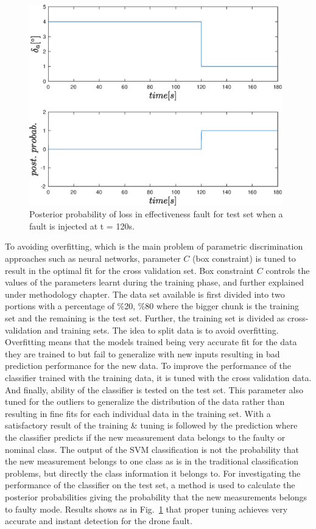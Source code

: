 \begin{figure}
\begin{center}
\includegraphics[width=11cm]{figures/post_prob}    %
\caption{Posterior probability of loss in effectiveness fault for test set when a fault is injected at t = 120s.} 
\label{fig:post_prob}
\end{center}
\end{figure}

To avoiding overfitting, which is the main problem of parametric discrimination approaches such as neural networks, parameter $C$ (box constraint) is tuned to result in the optimal fit for the cross validation set. Box constraint $C$ controls the values of the parameters learnt during the training phase, and further explained under methodology chapter.
The data set available is first divided into two portions with a percentage of \%20, \%80 where the bigger chunk is the training set and the remaining is the test set. 
Further, the training set is divided as cross-validation and training sets. 
The idea to split data is to avoid overfitting. 
Overfitting means that the models trained being very accurate fit for the data they are trained to but fail to generalize with new inputs resulting in bad prediction performance for the new data. 
To improve the performance of the classifier trained with the training data, it is tuned with the cross validation data. 
And finally, ability of the classifier is tested on the test set. 
This parameter also tuned for the outliers to generalize the distribution of the data rather than resulting in fine fits for each individual data in the training set. 
With a satisfactory result of the training \& tuning is followed by the prediction where the classifier predicts if the new measurement data belongs to the faulty or nominal class. 
The output of the SVM classification is not the probability that the new measurement belongs to one class as is in the traditional classification problems, but directly the class information it belongs to. 
For investigating the performance of the classifier on the test set, a method \cite{platt1999probabilistic} is used to calculate the posterior probabilities giving the probability that the new measurements belongs to faulty mode. 
Results shows as in  Fig.~\ref{fig:post_prob} that proper tuning achieves very accurate and instant detection for the drone fault. 
   
